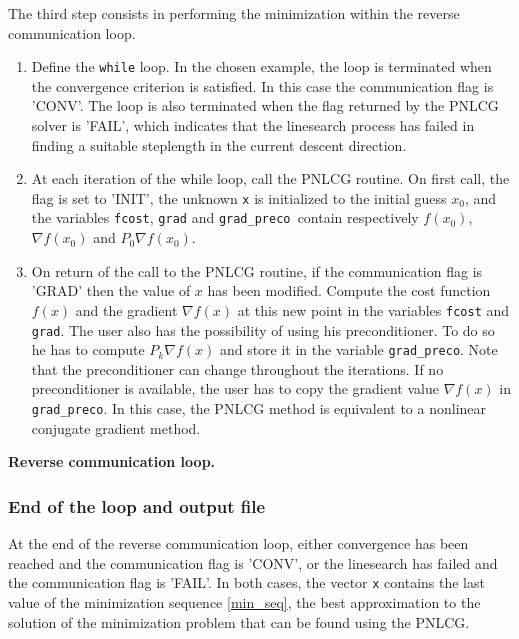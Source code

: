 \documentclass[a4paper,twoside,final,onecolumn,11pt,openright]{article}
\begin{document}
The third step consists in performing the minimization within the reverse communication loop. 
\begin{enumerate}
 \item Define the \texttt{while} loop. In the chosen example, the loop is terminated when the convergence criterion is satisfied. In this case the communication flag is 'CONV'. The loop is also terminated when the flag returned by the PNLCG solver is 'FAIL', which indicates that the linesearch process has failed in finding a suitable steplength in the current descent direction. 
 \item At each iteration of the while loop, call the PNLCG routine. On first call, the flag is set to 'INIT', the unknown \texttt{x} is initialized to the initial guess $x_0$, and the variables \texttt{fcost}, \texttt{grad} and \texttt{grad\_preco }contain respectively $f(x_0)$, $\nabla f(x_0)$ and $P_0\nabla f(x_0)$. 
\item On return of the call to the PNLCG routine, if the communication flag is 'GRAD' then the value of $x$ has been modified. Compute the cost function $f(x)$ and the gradient $\nabla f(x)$ at this new point in the variables \texttt{fcost} and \texttt{grad}. The user also has the possibility of using his preconditioner. To do so he has to compute $P_k\nabla f(x)$ and store it in the variable \texttt{grad\_preco}. Note that the preconditioner can change throughout the iterations. If no preconditioner is available, the user has to copy the gradient value $\nabla f(x)$ in \texttt{grad\_preco}. In this case, the PNLCG method is equivalent to a nonlinear conjugate gradient method. 
\end{enumerate}

\framebox{
\small
 
}
\normalsize
\begin{center}
\textbf{Reverse communication loop.} 
\end{center}

\subsubsection{End of the loop and output file}
At the end of the reverse communication loop, either convergence has been reached and the communication flag is 'CONV', or the linesearch has failed and the communication flag is 'FAIL'. In both cases, the vector \texttt{x} contains the last value of the minimization sequence \eqref{min_seq}, the best approximation to the solution of the minimization problem that can be found using the PNLCG. 
\end{document}
